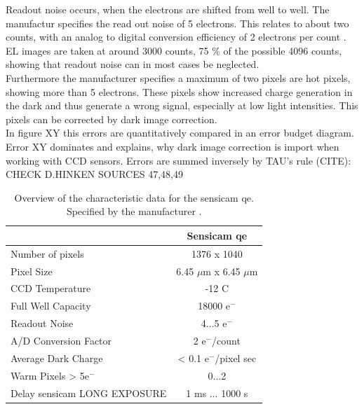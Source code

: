 Readout noise occurs, when the electrons are shifted from well to well. The manufactur specifies the read out noise of 5 electrons. This relates to about two counts, with an analog to digital conversion efficiency of 2 electrons per count \cite{ManualSensicam}. EL images are taken at around 3000 counts, 75 \% of the possible 4096 counts, showing that readout noise can in most cases be neglected. \\
Furthermore the manufacturer specifies a maximum of two pixels are hot pixels, showing more than 5 electrons. These pixels show increased charge generation in the dark and thus generate a wrong signal, especially at low light intensities. This pixels can be corrected by dark image correction.  \\
In figure XY this errors are quantitatively compared in an error budget diagram. Error XY dominates and explains, why dark image correction is import when working with CCD sensors. Errors are summed inversely by TAU's rule (CITE):\\
CHECK D.HINKEN SOURCES 47,48,49 
\begin{table}[h]
	\centering
	\caption{Overview of the characteristic data for the sensicam qe. Specified by the manufacturer \cite{ManualSensicam}.}
	\label{table:CCDcamera}
	\begin{tabular}{l c}
		\hline
		& \textbf{Sensicam qe} \\ \hline
		Number of pixels & 1376 x 1040 \\
		Pixel Size & 6.45 $\mu$m x 6.45 $\mu$m \\
		CCD Temperature & -12 \textdegree C \\
		Full Well Capacity & 18000 e$^-$ \\
		Readout Noise & 4...5 e$^-$ \\
		A/D Conversion Factor & 2 e$^-$/count \\
		Average Dark Charge & < 0.1 e$^-$/pixel sec \\
		Warm Pixels > 5e$^-$ & 0...2 \\
		Delay sensicam LONG EXPOSURE & 1 ms ... 1000 s \\ \hline
	\end{tabular}
\end{table}